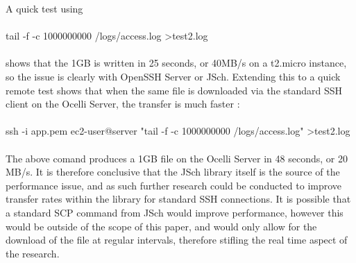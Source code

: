 \documentclass{llncs}
\begin{document}
A quick test using
\\
\\
tail -f -c 1000000000 /logs/access.log \textgreater  test2.log
\\
\\
shows that the 1GB is written in 25 seconds, or 40MB/s on a t2.micro instance, so the issue is clearly with OpenSSH Server or JSch. Extending this to a quick remote test shows that when the same file is downloaded via the standard SSH client on the Ocelli Server, the transfer is much faster :
\\
\\
ssh -i app.pem ec2-user@server  "tail -f -c 1000000000 /logs/access.log" \textgreater  test2.log
\\
\\
The above comand produces a 1GB file on the Ocelli Server in 48 seconds, or 20 MB/s. It is therefore conclusive that the JSch library itself is the source of the performance issue, and as such further research could be conducted to improve transfer rates within the library for standard SSH connections. It is possible that a standard SCP command from JSch would improve performance, however this would be outside of the scope of this paper, and would only allow for the download of the file at regular intervals, therefore stifling the real time aspect of the research.
\pagebreak
\end{document}
